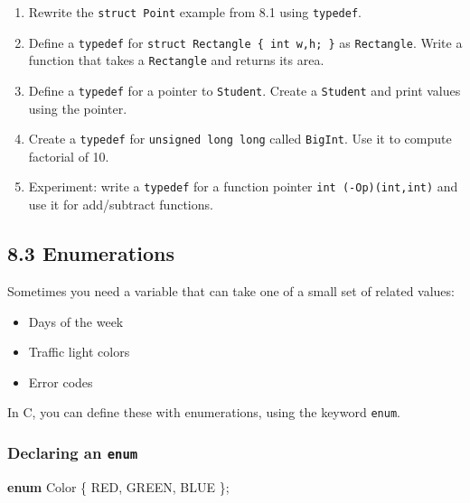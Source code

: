\documentclass[
  letterpaper,
  DIV=11,
  numbers=noendperiod]{scrreprt}
\newenvironment{Shaded}{\begin{snugshade}}{\end{snugshade}}
\newcommand{\KeywordTok}[1]{\textcolor[rgb]{0.00,0.23,0.31}{\textbf{#1}}}
\newcommand{\NormalTok}[1]{\textcolor[rgb]{0.00,0.23,0.31}{#1}}
\newcommand{\OperatorTok}[1]{\textcolor[rgb]{0.37,0.37,0.37}{#1}}
\providecommand{\tightlist}{%
  \setlength{\itemsep}{0pt}\setlength{\parskip}{0pt}}
\begin{document}
\begin{enumerate}
\def\labelenumi{\arabic{enumi}.}
\tightlist
\item
  Rewrite the \texttt{struct\ Point} example from 8.1 using
  \texttt{typedef}.
\item
  Define a \texttt{typedef} for
  \texttt{struct\ Rectangle\ \{\ int\ w,h;\ \}} as \texttt{Rectangle}.
  Write a function that takes a \texttt{Rectangle} and returns its area.
\item
  Define a \texttt{typedef} for a pointer to \texttt{Student}. Create a
  \texttt{Student} and print values using the pointer.
\item
  Create a \texttt{typedef} for \texttt{unsigned\ long\ long} called
  \texttt{BigInt}. Use it to compute factorial of 10.
\item
  Experiment: write a \texttt{typedef} for a function pointer
  \texttt{int\ (-Op)(int,int)} and use it for add/subtract functions.
\end{enumerate}

\subsection{8.3 Enumerations}\label{enumerations}

Sometimes you need a variable that can take one of a small set of
related values:

\begin{itemize}
\tightlist
\item
  Days of the week
\item
  Traffic light colors
\item
  Error codes
\end{itemize}

In C, you can define these with enumerations, using the keyword
\texttt{enum}.

\subsubsection{\texorpdfstring{Declaring an
\texttt{enum}}{Declaring an enum}}\label{declaring-an-enum}

\begin{Shaded}
\begin{Highlighting}[]
\KeywordTok{enum}\NormalTok{ Color }\OperatorTok{\{}
\NormalTok{    RED}\OperatorTok{,}
\NormalTok{    GREEN}\OperatorTok{,}
\NormalTok{    BLUE}
\OperatorTok{\};}
\end{Highlighting}
\end{Shaded}
\end{document}
